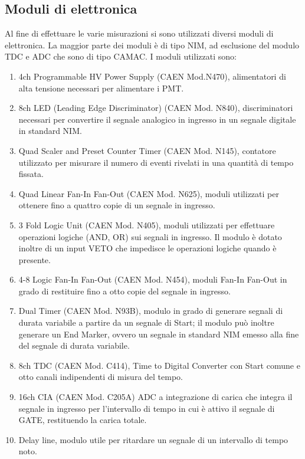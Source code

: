 \documentclass{standalone}
\begin{document}
\subsection{Moduli di elettronica}
Al fine di effettuare le varie misurazioni si sono utilizzati diversi moduli di elettronica. La maggior parte dei moduli è di tipo NIM, ad esclusione del modulo TDC e ADC che sono di tipo CAMAC.
I moduli utilizzati sono:\\
\begin{enumerate}
	\item 4ch Programmable HV Power Supply (CAEN Mod.N470), alimentatori di alta tensione necessari per alimentare i PMT.
	\item 8ch LED (Leading Edge Discriminator) (CAEN Mod. N840), discriminatori necessari per convertire il segnale analogico in ingresso in un segnale digitale in standard NIM.
	\item Quad Scaler and Preset Counter Timer (CAEN Mod. N145), contatore utilizzato per misurare il numero di eventi rivelati in una quantit\`a di tempo fissata.
	\item Quad Linear Fan-In Fan-Out (CAEN Mod. N625), moduli utilizzati per ottenere fino a quattro copie di un segnale in ingresso.
	\item 3 Fold Logic Unit (CAEN Mod. N405), moduli utilizzati per effettuare operazioni logiche (AND, OR) sui segnali in ingresso. Il modulo \`e dotato inoltre di un input VETO che impedisce le operazioni logiche quando \`e presente. 
	\item 4-8 Logic Fan-In Fan-Out (CAEN Mod. N454), moduli Fan-In Fan-Out in grado di restituire fino a otto copie del segnale in ingresso.
	\item Dual Timer (CAEN Mod. N93B), modulo in grado di generare segnali di durata variabile a partire da un segnale di Start; il modulo pu\`o inoltre generare un End Marker, ovvero un segnale in standard NIM emesso alla fine del segnale di durata variabile.
	\item 8ch TDC (CAEN Mod. C414), Time to Digital Converter con Start comune e otto canali indipendenti di misura del tempo.
	\item 16ch CIA (CAEN Mod. C205A) ADC a integrazione di carica che integra il segnale in ingresso per l'intervallo di tempo in cui \`e attivo il segnale di GATE, restituendo la carica totale. 
	\item Delay line, modulo utile per ritardare un segnale di un intervallo di tempo noto.  
\end{enumerate}
\end{document}
